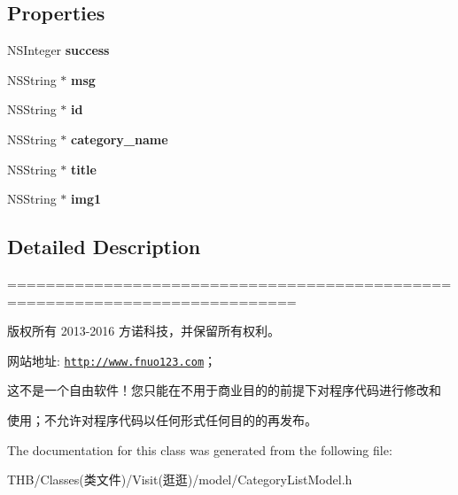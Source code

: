 \subsection*{Properties}
\begin{DoxyCompactItemize}
\item 
\mbox{\label{interface_category_list_model_a738b2bfc46ddf0f26bcae31b14e77cf7}} 
N\+S\+Integer {\bfseries success}
\item 
\mbox{\label{interface_category_list_model_a22a262844661e4dd3927203c3807e760}} 
N\+S\+String $\ast$ {\bfseries msg}
\item 
\mbox{\label{interface_category_list_model_a41ab9b27adc7812336a27aaba1d25d25}} 
N\+S\+String $\ast$ {\bfseries id}
\item 
\mbox{\label{interface_category_list_model_a2c109aa39c326698e387d95bc6cb80e7}} 
N\+S\+String $\ast$ {\bfseries category\+\_\+name}
\item 
\mbox{\label{interface_category_list_model_a26087db8147be0f4d2eb96bb3c312d2b}} 
N\+S\+String $\ast$ {\bfseries title}
\item 
\mbox{\label{interface_category_list_model_ab9a89a34194f17f0e794f95fdab955ef}} 
N\+S\+String $\ast$ {\bfseries img1}
\end{DoxyCompactItemize}


\subsection{Detailed Description}
============================================================================

版权所有 2013-\/2016 方诺科技，并保留所有权利。

网站地址\+: \href{http://www.fnuo123.com}{\tt http\+://www.\+fnuo123.\+com}； 



这不是一个自由软件！您只能在不用于商业目的的前提下对程序代码进行修改和

使用；不允许对程序代码以任何形式任何目的的再发布。 

 

The documentation for this class was generated from the following file\+:\begin{DoxyCompactItemize}
\item 
T\+H\+B/\+Classes(类文件)/\+Visit(逛逛)/model/Category\+List\+Model.\+h\end{DoxyCompactItemize}
